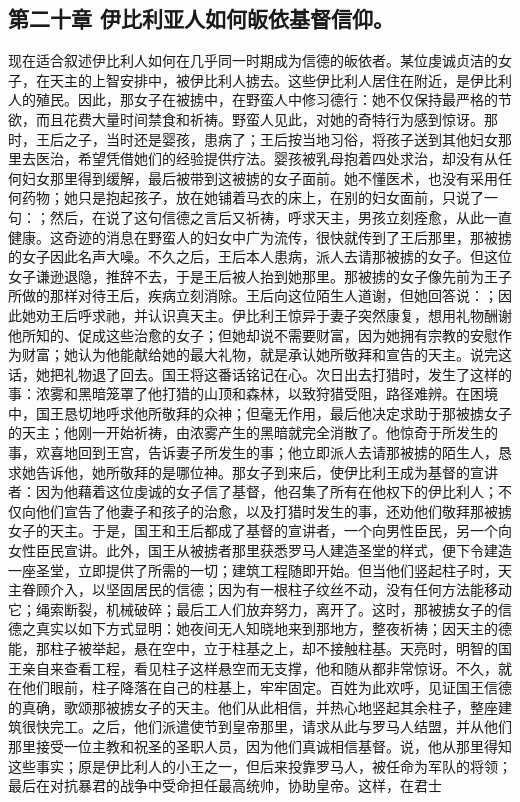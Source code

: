 
\subsection{第二十章 伊比利亚人如何皈依基督信仰。}

现在适合叙述伊比利人如何在几乎同一时期成为信德的皈依者。某位虔诚贞洁的女子，在天主的上智安排中，被伊比利人掳去。这些伊比利人居住在附近，是伊比利人的殖民。因此，那女子在被掳中，在野蛮人中修习德行：她不仅保持最严格的节欲，而且花费大量时间禁食和祈祷。野蛮人见此，对她的奇特行为感到惊讶。那时，王后之子，当时还是婴孩，患病了；王后按当地习俗，将孩子送到其他妇女那里去医治，希望凭借她们的经验提供疗法。婴孩被乳母抱着四处求治，却没有从任何妇女那里得到缓解，最后被带到这被掳的女子面前。她不懂医术，也没有采用任何药物；她只是抱起孩子，放在她铺着马衣的床上，在别的妇女面前，只说了一句：；然后，在说了这句信德之言后又祈祷，呼求天主，男孩立刻痊愈，从此一直健康。这奇迹的消息在野蛮人的妇女中广为流传，很快就传到了王后那里，那被掳的女子因此名声大噪。不久之后，王后本人患病，派人去请那被掳的女子。但这位女子谦逊退隐，推辞不去，于是王后被人抬到她那里。那被掳的女子像先前为王子所做的那样对待王后，疾病立刻消除。王后向这位陌生人道谢，但她回答说：；因此她劝王后呼求祂，并认识真天主。伊比利王惊异于妻子突然康复，想用礼物酬谢他所知的、促成这些治愈的女子；但她却说不需要财富，因为她拥有宗教的安慰作为财富；她认为他能献给她的最大礼物，就是承认她所敬拜和宣告的天主。说完这话，她把礼物退了回去。国王将这番话铭记在心。次日出去打猎时，发生了这样的事：浓雾和黑暗笼罩了他打猎的山顶和森林，以致狩猎受阻，路径难辨。在困境中，国王恳切地呼求他所敬拜的众神；但毫无作用，最后他决定求助于那被掳女子的天主；他刚一开始祈祷，由浓雾产生的黑暗就完全消散了。他惊奇于所发生的事，欢喜地回到王宫，告诉妻子所发生的事；他立即派人去请那被掳的陌生人，恳求她告诉他，她所敬拜的是哪位神。那女子到来后，使伊比利王成为基督的宣讲者：因为他藉着这位虔诚的女子信了基督，他召集了所有在他权下的伊比利人；不仅向他们宣告了他妻子和孩子的治愈，以及打猎时发生的事，还劝他们敬拜那被掳女子的天主。于是，国王和王后都成了基督的宣讲者，一个向男性臣民，另一个向女性臣民宣讲。此外，国王从被掳者那里获悉罗马人建造圣堂的样式，便下令建造一座圣堂，立即提供了所需的一切；建筑工程随即开始。但当他们竖起柱子时，天主眷顾介入，以坚固居民的信德；因为有一根柱子纹丝不动，没有任何方法能移动它；绳索断裂，机械破碎；最后工人们放弃努力，离开了。这时，那被掳女子的信德之真实以如下方式显明：她夜间无人知晓地来到那地方，整夜祈祷；因天主的德能，那柱子被举起，悬在空中，立于柱基之上，却不接触柱基。天亮时，明智的国王亲自来查看工程，看见柱子这样悬空而无支撑，他和随从都非常惊讶。不久，就在他们眼前，柱子降落在自己的柱基上，牢牢固定。百姓为此欢呼，见证国王信德的真确，歌颂那被掳女子的天主。他们从此相信，并热心地竖起其余柱子，整座建筑很快完工。之后，他们派遣使节到皇帝那里，请求从此与罗马人结盟，并从他们那里接受一位主教和祝圣的圣职人员，因为他们真诚相信基督。说，他从那里得知这些事实；原是伊比利人的小王之一，但后来投靠罗马人，被任命为军队的将领；最后在对抗暴君的战争中受命担任最高统帅，协助皇帝。这样，在君士